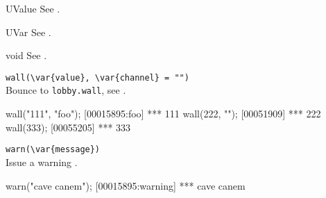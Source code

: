 \begin{urbiscriptapi}
\item[UValue] See .

\item[UVar] See .
\item[void] See .
\item \lstinline|wall(\var{value}, \var{channel} = "")|\\
  Bounce to \lstinline|lobby.wall|, see .
\begin{urbiscript}
wall("111", "foo");
[00015895:foo] *** 111
wall(222, "");
[00051909] *** 222
wall(333);
[00055205] *** 333
\end{urbiscript}

\item \lstinline|warn(\var{message})|\\
  Issue a warning .
\begin{urbiscript}
warn("cave canem");
[00015895:warning] *** cave canem
\end{urbiscript}

\end{urbiscriptapi}

